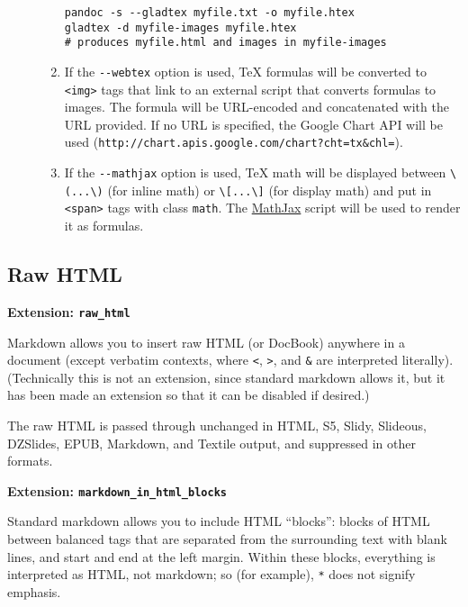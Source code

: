 \documentclass[]{article}
\begin{document}
\begin{description}
\begin{enumerate}
\begin{verbatim}
pandoc -s --gladtex myfile.txt -o myfile.htex
gladtex -d myfile-images myfile.htex
# produces myfile.html and images in myfile-images
\end{verbatim}
\item
  If the \texttt{-{}-webtex} option is used, TeX formulas will be
  converted to \texttt{\textless{}img\textgreater{}} tags that link to
  an external script that converts formulas to images. The formula will
  be URL-encoded and concatenated with the URL provided. If no URL is
  specified, the Google Chart API will be used
  (\texttt{http://chart.apis.google.com/chart?cht=tx\&chl=}).
\item
  If the \texttt{-{}-mathjax} option is used, TeX math will be displayed
  between \texttt{\textbackslash{}(...\textbackslash{})} (for inline
  math) or \texttt{\textbackslash{}{[}...\textbackslash{}{]}} (for
  display math) and put in \texttt{\textless{}span\textgreater{}} tags
  with class \texttt{math}. The \href{http://www.mathjax.org/}{MathJax}
  script will be used to render it as formulas.
\end{enumerate}
\end{description}

\subsection{Raw HTML}\label{raw-html}

\textbf{Extension: \texttt{raw\_html}}

Markdown allows you to insert raw HTML (or DocBook) anywhere in a
document (except verbatim contexts, where \texttt{\textless{}},
\texttt{\textgreater{}}, and \texttt{\&} are interpreted literally).
(Technically this is not an extension, since standard markdown allows
it, but it has been made an extension so that it can be disabled if
desired.)

The raw HTML is passed through unchanged in HTML, S5, Slidy, Slideous,
DZSlides, EPUB, Markdown, and Textile output, and suppressed in other
formats.

\textbf{Extension: \texttt{markdown\_in\_html\_blocks}}

Standard markdown allows you to include HTML ``blocks'': blocks of HTML
between balanced tags that are separated from the surrounding text with
blank lines, and start and end at the left margin. Within these blocks,
everything is interpreted as HTML, not markdown; so (for example),
\texttt{*} does not signify emphasis.
\end{document}
